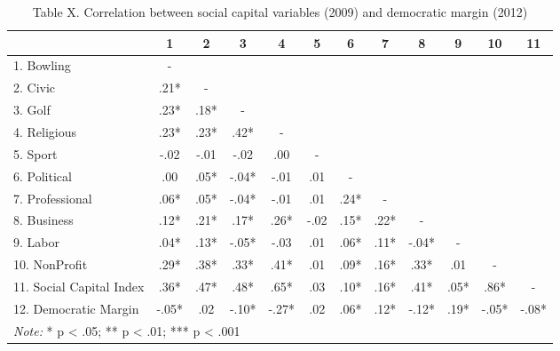 \documentclass[
  english,
  man]{apa6}
\begin{document}
\begin{table}

\caption{\label{tab:regression}Table X. Correlation between social capital variables (2009) and democratic margin (2012)}
\centering
\begin{tabular}[t]{l|c|c|c|c|c|c|c|c|c|c|c}
\hline
  & 1 & 2 & 3 & 4 & 5 & 6 & 7 & 8 & 9 & 10 & 11\\
\hline
1. Bowling & - &  &  &  &  &  &  &  &  &  & \\
\hline
2. Civic & .21* & - &  &  &  &  &  &  &  &  & \\
\hline
3. Golf & .23* & .18* & - &  &  &  &  &  &  &  & \\
\hline
4. Religious & .23* & .23* & .42* & - &  &  &  &  &  &  & \\
\hline
5. Sport & -.02 & -.01 & -.02 & .00 & - &  &  &  &  &  & \\
\hline
6. Political & .00 & .05* & -.04* & -.01 & .01 & - &  &  &  &  & \\
\hline
7. Professional & .06* & .05* & -.04* & -.01 & .01 & .24* & - &  &  &  & \\
\hline
8. Business & .12* & .21* & .17* & .26* & -.02 & .15* & .22* & - &  &  & \\
\hline
9. Labor & .04* & .13* & -.05* & -.03 & .01 & .06* & .11* & -.04* & - &  & \\
\hline
10. NonProfit & .29* & .38* & .33* & .41* & .01 & .09* & .16* & .33* & .01 & - & \\
\hline
11. Social Capital Index & .36* & .47* & .48* & .65* & .03 & .10* & .16* & .41* & .05* & .86* & -\\
\hline
12. Democratic Margin & -.05* & .02 & -.10* & -.27* & .02 & .06* & .12* & -.12* & .19* & -.05* & -.08*\\
\hline
\multicolumn{12}{l}{\rule{0pt}{1em}\textit{Note: } * p < .05; ** p < .01; *** p < .001}\\
\end{tabular}
\end{table}
\end{document}
